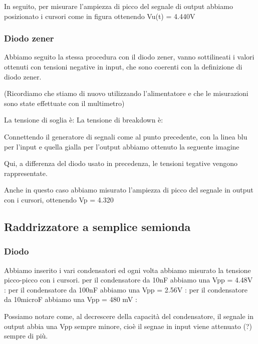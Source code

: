 \documentclass[a4paper]{article}
\begin{document}
			In seguito, per misurare l'ampiezza di picco del segnale di output abbiamo posizionato i cursori come in figura ottenendo Vu(t) = 4.440V %
			
			\subsubsection{Diodo zener}
			Abbiamo seguito la stessa procedura con il diodo zener, vanno sottilineati i valori ottenuti con tensioni negative in input, che sono coerenti con la definizione di diodo zener.

			(Ricordiamo che stiamo di nuovo utilizzando l'alimentatore e che le misurazioni sono state effettuate con il multimetro)

		La tensione di soglia è: 
		La tensione di breakdown è:
		
		Connettendo il generatore di segnali come al punto precedente, con la linea blu per l'input e quella gialla per l'output abbiamo ottenuto la seguente imagine
		
		Qui, a differenza del diodo usato in precedenza, le tensioni tegative vengono rappresentate.		
		
		Anche in questo caso abbiamo misurato l'ampiezza di picco del segnale in output con i cursori, ottenendo Vp = 4.320 %
		
		\subsection{Raddrizzatore a semplice semionda}
			\subsubsection{Diodo}
				Abbiamo inserito i vari condensatori ed ogni volta abbiamo misurato la tensione picco-picco con i cursori.
				per il condensatore da 10nF abbiamo una Vpp = 4.48V :
				per il condensatore da 100nF abbiamo una Vpp = 2.56V :
				per il condensatore da 10microF abbiamo una Vpp = 480 mV :
				
				Possiamo notare come, al decrescere della capacità del condensatore, il segnale in output abbia una Vpp sempre minore, cioè il segnae in input viene attenuato (?) sempre di più.
\end{document}
